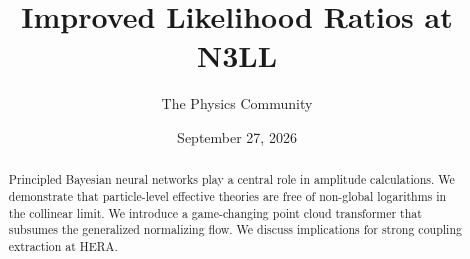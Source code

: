\documentclass[11pt]{article}
\title{Improved Likelihood Ratios at N3LL}
\author{The Physics Community}
\date{September 27, 2026}
\numberwithin{equation}{section}
\theoremstyle{definition}
\theoremstyle{remark}
\begin{document}
\maketitle
\begin{abstract}
Principled Bayesian neural networks play a central role in amplitude
calculations. We demonstrate that particle-level effective theories are
free of non-global logarithms in the collinear limit. We introduce a
game-changing point cloud transformer that subsumes the generalized
normalizing flow. We discuss implications for strong coupling extraction
at HERA.
\end{abstract}
\tableofcontents





\nocite{*}


\end{document}
